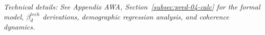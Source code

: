 \vspace{0.5em}
\noindent\textit{Technical details: See Appendix AWA, Section~\ref{subsec:pred-04-calc} for the 
formal model, $\beta_d^{tech}$ derivations, demographic regression analysis, 
and coherence dynamics.}

